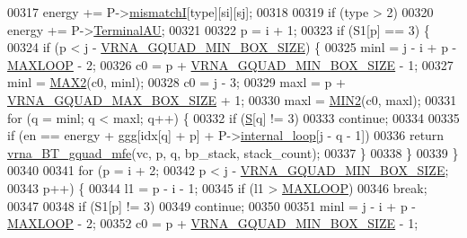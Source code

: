 \begin{DoxyCode}
00317     energy += P->\mbox{\hyperlink{group__energy__parameters_af1a456ce5983b107c47e5dd25727205e}{mismatchI}}[type][si][sj];
00318 
00319   \textcolor{keywordflow}{if} (type > 2)
00320     energy += P->\mbox{\hyperlink{group__energy__parameters_a0ad35507a03ba7f751e82cb375e991dd}{TerminalAU}};
00321 
00322   p = i + 1;
00323   \textcolor{keywordflow}{if} (S1[p] == 3) \{
00324     \textcolor{keywordflow}{if} (p < j - \mbox{\hyperlink{group__energy__parameters_gad7bdd880afca461f97763d79ee57a347}{VRNA\_GQUAD\_MIN\_BOX\_SIZE}}) \{
00325       minl  = j - i + p - \mbox{\hyperlink{energy__const_8h_ad1bd6eabac419670ddd3c9ed82145988}{MAXLOOP}} - 2;
00326       c0    = p + \mbox{\hyperlink{group__energy__parameters_gad7bdd880afca461f97763d79ee57a347}{VRNA\_GQUAD\_MIN\_BOX\_SIZE}} - 1;
00327       minl  = \mbox{\hyperlink{group__utils_ga33297b3679c713b0c4d897cd0fe3b122}{MAX2}}(c0, minl);
00328       c0    = j - 3;
00329       maxl  = p + \mbox{\hyperlink{group__energy__parameters_ga56cafabad2f8a7db83f2d5d3b0e8d313}{VRNA\_GQUAD\_MAX\_BOX\_SIZE}} + 1;
00330       maxl  = \mbox{\hyperlink{group__utils_gae0b9cd0ce090bd69b951aa73e8fa4f7d}{MIN2}}(c0, maxl);
00331       \textcolor{keywordflow}{for} (q = minl; q < maxl; q++) \{
00332         \textcolor{keywordflow}{if} (\mbox{\hyperlink{group__energy__parameters__rw_gga7bf2bb363bcf5ce50d60255d256e5682af1ce01387d2348f8b858721a7db81670}{S}}[q] != 3)
00333           \textcolor{keywordflow}{continue};
00334 
00335         \textcolor{keywordflow}{if} (en == energy + ggg[idx[q] + p] + P->\mbox{\hyperlink{group__energy__parameters_a2a4fb2c65023ec371c9b96573da6d2fc}{internal\_loop}}[j - q - 1])
00336           \textcolor{keywordflow}{return} \mbox{\hyperlink{group__gquads_gad10fb8ad7ce3ba46d7d53ca7fefbcd80}{vrna\_BT\_gquad\_mfe}}(vc, p, q, bp\_stack, stack\_count);
00337       \}
00338     \}
00339   \}
00340 
00341   \textcolor{keywordflow}{for} (p = i + 2;
00342        p < j - \mbox{\hyperlink{group__energy__parameters_gad7bdd880afca461f97763d79ee57a347}{VRNA\_GQUAD\_MIN\_BOX\_SIZE}};
00343        p++) \{
00344     l1 = p - i - 1;
00345     \textcolor{keywordflow}{if} (l1 > \mbox{\hyperlink{energy__const_8h_ad1bd6eabac419670ddd3c9ed82145988}{MAXLOOP}})
00346       \textcolor{keywordflow}{break};
00347 
00348     \textcolor{keywordflow}{if} (S1[p] != 3)
00349       \textcolor{keywordflow}{continue};
00350 
00351     minl  = j - i + p - \mbox{\hyperlink{energy__const_8h_ad1bd6eabac419670ddd3c9ed82145988}{MAXLOOP}} - 2;
00352     c0    = p + \mbox{\hyperlink{group__energy__parameters_gad7bdd880afca461f97763d79ee57a347}{VRNA\_GQUAD\_MIN\_BOX\_SIZE}} - 1;

\end{DoxyCode}
